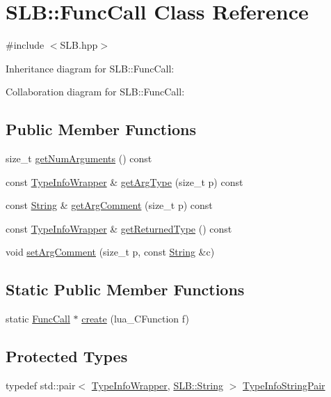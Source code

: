 \hypertarget{classSLB_1_1FuncCall}{}\section{S\+LB\+:\+:Func\+Call Class Reference}
\label{classSLB_1_1FuncCall}


{\ttfamily \#include $<$S\+L\+B.\+hpp$>$}



Inheritance diagram for S\+LB\+:\+:Func\+Call\+:


Collaboration diagram for S\+LB\+:\+:Func\+Call\+:
\subsection*{Public Member Functions}
\begin{DoxyCompactItemize}
\item 
size\+\_\+t \hyperlink{classSLB_1_1FuncCall_ab784a9ccd4080145a51d5cdf267013a3}{get\+Num\+Arguments} () const 
\item 
const \hyperlink{classSLB_1_1TypeInfoWrapper}{Type\+Info\+Wrapper} \& \hyperlink{classSLB_1_1FuncCall_a1cf9a34ed158130aa4228b0abb6bbcb1}{get\+Arg\+Type} (size\+\_\+t p) const 
\item 
const \hyperlink{namespaceSLB_a6a4c36e7004d99c0535c2c91c200c9a1}{String} \& \hyperlink{classSLB_1_1FuncCall_af3b947ba525eb548d8b5df33cfb2ad10}{get\+Arg\+Comment} (size\+\_\+t p) const 
\item 
const \hyperlink{classSLB_1_1TypeInfoWrapper}{Type\+Info\+Wrapper} \& \hyperlink{classSLB_1_1FuncCall_acd20114490194bc7d5803f9c3f519fec}{get\+Returned\+Type} () const 
\item 
void \hyperlink{classSLB_1_1FuncCall_aca4ce0049ef72e0e478250e91c290beb}{set\+Arg\+Comment} (size\+\_\+t p, const \hyperlink{namespaceSLB_a6a4c36e7004d99c0535c2c91c200c9a1}{String} \&c)
\end{DoxyCompactItemize}
\subsection*{Static Public Member Functions}
\begin{DoxyCompactItemize}
\item 
static \hyperlink{classSLB_1_1FuncCall}{Func\+Call} $\ast$ \hyperlink{classSLB_1_1FuncCall_a5a413ea283322660faab78fae41a9f53}{create} (lua\+\_\+\+C\+Function f)
\end{DoxyCompactItemize}
\subsection*{Protected Types}
\begin{DoxyCompactItemize}
\item 
typedef std\+::pair$<$ \hyperlink{classSLB_1_1TypeInfoWrapper}{Type\+Info\+Wrapper}, \hyperlink{namespaceSLB_a6a4c36e7004d99c0535c2c91c200c9a1}{S\+L\+B\+::\+String} $>$ \hyperlink{classSLB_1_1FuncCall_a29ced3919d9548581c8d6893b2af305b}{Type\+Info\+String\+Pair}
\end{DoxyCompactItemize}
